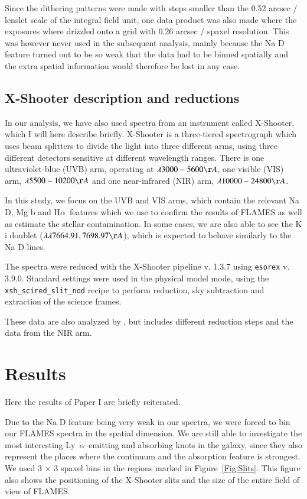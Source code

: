 \documentclass[a4wide,12pt]{book}
\newcommand{\ha}{H${\alpha}$}
\newcommand{\lya}{Ly~${\alpha}$}
\begin{document}
{Since the dithering patterns were made with steps smaller than the 0.52 arcsec / lenslet scale of the integral field unit, one data product was also made where the exposures where drizzled onto a grid with 0.26 arcsec / spaxel resolution. This was however never used in the subsequent analysis, mainly because the Na D feature turned out to be so weak that the data had to be binned spatially and the extra spatial information would therefore be lost in any case. 

\section{X-Shooter description and reductions}

In our analysis, we have also used spectra from an instrument called X-Shooter, which I will here describe briefly. X-Shooter is a three-tiered spectrograph which uses beam splitters to divide the light into three different arms, using three different detectors sensitive at different wavelength ranges. There is one ultraviolet-blue (UVB) arm, operating at $\lambda 3000 - 5600 \AA$, one visible (VIS) arm, $\lambda 5500 - 10200 \AA$ and one near-infrared (NIR) arm, $\lambda 10000 - 24800 \AA$.

In this study, we focus on the UVB and VIS arms, which contain the relevant Na D, Mg b and \ha\ features which we use to confirm the results of FLAMES as well as estimate the stellar contamination. In some cases, we are also able to see the K {\sc i} doublet ($\lambda \lambda 7664.91, 7698.97 \AA$), which is expected to behave similarly to the Na D lines.   

The spectra were reduced with the X-Shooter pipeline v. 1.3.7 using \texttt{esorex} v. 3.9.0. Standard settings were used in the physical model mode, using the \texttt{xsh\_scired\_slit\_nod} recipe to perform reduction, sky subtraction and extraction of the science frames. 

These data are also analyzed by \citet{guseva-2012}, but includes different reduction steps and the data from the NIR arm.


\chapter{Results}

Here the results of Paper I are briefly reiterated. 

Due to the Na D feature being very weak in our spectra, we were forced to bin our FLAMES spectra in the spatial dimension. We are still able to investigate the most interesting \lya\ emitting and absorbing knots in the galaxy, since they also represent the places where the continuum and the absorption feature is strongest. We used 3 $\times$ 3 spaxel bins in the regions marked in Figure~\ref{Fig:Slits}. This figure also shows the positioning of the X-Shooter slits and the size of the entire field of view of FLAMES. 

}
\end{document}
